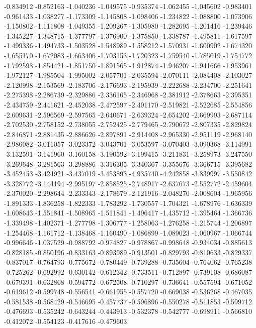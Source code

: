 -0.834912
-0.852163
-1.040236
-1.049575
-0.935374
-1.062455
-1.045602
-0.983401
-0.961433
-1.038277
-1.173309
-1.145808
-1.098406
-1.234822
-1.088800
-1.073906
-1.150802
-1.111808
-1.049355
-1.209267
-1.305980
-1.282695
-1.201416
-1.239446
-1.345227
-1.348715
-1.377797
-1.376900
-1.375850
-1.338787
-1.495811
-1.617597
-1.499336
-1.494733
-1.503528
-1.548989
-1.558212
-1.570931
-1.600902
-1.674320
-1.655170
-1.672083
-1.663406
-1.703153
-1.720323
-1.759540
-1.785019
-1.754772
-1.792598
-1.854421
-1.851750
-1.891565
-1.912874
-1.946207
-1.941666
-1.953961
-1.972127
-1.985504
-1.995002
-2.057701
-2.035594
-2.070111
-2.084408
-2.103027
-2.120998
-2.153569
-2.183706
-2.176693
-2.195939
-2.222688
-2.234700
-2.251641
-2.275398
-2.286739
-2.329886
-2.336165
-2.346968
-2.381912
-2.378663
-2.395351
-2.434759
-2.441621
-2.452038
-2.472597
-2.491170
-2.519821
-2.522685
-2.554856
-2.609631
-2.596569
-2.597565
-2.640671
-2.639324
-2.654202
-2.669993
-2.687114
-2.702530
-2.758152
-2.738055
-2.752425
-2.779465
-2.790672
-2.807335
-2.829824
-2.846871
-2.881435
-2.886626
-2.897891
-2.914408
-2.965330
-2.951119
-2.968140
-2.986082
-3.011057
-3.023372
-3.043701
-3.053597
-3.070403
-3.090368
-3.114991
-3.132591
-3.141960
-3.160158
-3.190592
-3.199415
-3.211831
-3.258973
-3.247550
-3.269648
-3.281563
-3.298886
-3.316305
-3.340367
-3.355676
-3.366715
-3.395682
-3.452453
-3.424921
-3.437019
-3.453893
-4.935740
-4.242858
-3.839997
-3.550842
-3.328772
-3.144194
-2.995197
-2.858525
-2.748917
-2.637673
-2.552772
-2.459604
-2.370020
-2.298644
-2.233343
-2.178679
-2.121916
-2.048270
-2.008604
-1.965956
-1.891333
-1.836258
-1.822333
-1.783292
-1.730557
-1.704321
-1.678976
-1.636339
-1.608643
-1.551841
-1.508965
-1.511841
-1.496417
-1.435712
-1.395464
-1.366736
-1.339498
-1.402371
-1.277798
-1.306777
-1.258063
-1.276258
-1.215744
-1.206897
-1.254468
-1.161712
-1.138468
-1.160490
-1.086899
-1.089023
-1.060967
-1.066744
-0.996646
-1.037529
-0.988792
-0.974827
-0.978867
-0.998648
-0.934034
-0.885613
-0.828185
-0.850196
-0.833163
-0.893989
-0.913501
-0.829793
-0.810633
-0.829337
-0.837017
-0.764793
-0.775672
-0.780449
-0.739288
-0.735604
-0.764062
-0.765238
-0.725262
-0.692992
-0.630142
-0.612342
-0.733511
-0.712897
-0.739108
-0.686087
-0.679391
-0.632868
-0.594772
-0.672508
-0.710297
-0.736641
-0.557594
-0.671052
-0.619612
-0.599748
-0.556541
-0.661955
-0.557720
-0.669038
-0.536268
-0.467035
-0.581538
-0.568429
-0.546695
-0.457737
-0.596896
-0.550278
-0.511853
-0.599712
-0.476693
-0.535242
-0.643244
-0.443913
-0.532378
-0.542777
-0.698911
-0.566810
-0.412072
-0.554123
-0.417616
-0.479603

